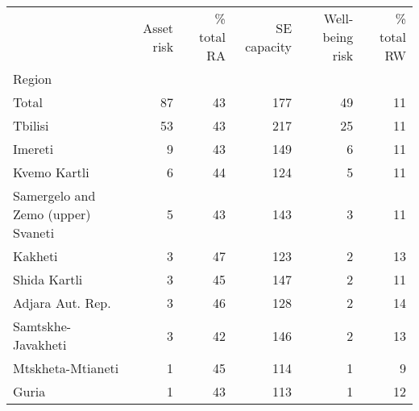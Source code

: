 \begin{tabular}{lrrrrr}
\toprule
{} &  Asset risk &  \% total RA &  SE capacity &  Well-being risk &  \% total RW \\
Region                             &             &             &              &                  &             \\
\midrule
Total                              &          87 &          43 &          177 &               49 &          11 \\
Tbilisi                            &          53 &          43 &          217 &               25 &          11 \\
Imereti                            &           9 &          43 &          149 &                6 &          11 \\
Kvemo Kartli                       &           6 &          44 &          124 &                5 &          11 \\
Samergelo and Zemo (upper) Svaneti &           5 &          43 &          143 &                3 &          11 \\
Kakheti                            &           3 &          47 &          123 &                2 &          13 \\
Shida Kartli                       &           3 &          45 &          147 &                2 &          11 \\
Adjara Aut. Rep.                   &           3 &          46 &          128 &                2 &          14 \\
Samtskhe-Javakheti                 &           3 &          42 &          146 &                2 &          13 \\
Mtskheta-Mtianeti                  &           1 &          45 &          114 &                1 &           9 \\
Guria                              &           1 &          43 &          113 &                1 &          12 \\
\bottomrule
\end{tabular}

